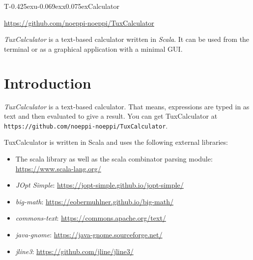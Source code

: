 \documentclass[10pt]{article}
\begin{document}
    \begin{center}
        {\Huge\fontsize{37pt}{37pt}\selectfont T\kern-0.425exu\kern-0.069exx\kern0.075exCalculator}
        
        \vspace*{24pt}
        \url{https://github.com/noeppi-noeppi/TuxCalculator}
    \end{center}
    \vspace*{48pt}
    
    \textit{TuxCalculator} is a text-based calculator written in \textsl{Scala}.
    It can be used from the terminal or as a graphical application with a minimal GUI\@.
    \vspace*{12pt}
    
    \tableofcontents
    \clearpage
    
    \section{Introduction}\label{sec:introduction}
    \textit{TuxCalculator} is a text-based calculator.
    That means, expressions are typed in as text and then evaluated to give a result.
    You can get TuxCalculator at \verb|https://github.com/noeppi-noeppi/TuxCalculator|.
    
    TuxCalculator is written in Scala and uses the following external libraries:
    \begin{itemize}
        \item The scala library as well as the scala combinator parsing module: \url{https://www.scala-lang.org/}
        \item \textsl{JOpt Simple}: \url{https://jopt-simple.github.io/jopt-simple/}
        \item \textsl{big-math}: \url{https://eobermuhlner.github.io/big-math/}
        \item \textsl{commons-text}: \url{https://commons.apache.org/text/}
        \item \textsl{java-gnome}: \url{https://java-gnome.sourceforge.net/}
        \item \textsl{jline3}: \url{https://github.com/jline/jline3/}
    \end{itemize}
    
\end{document}
